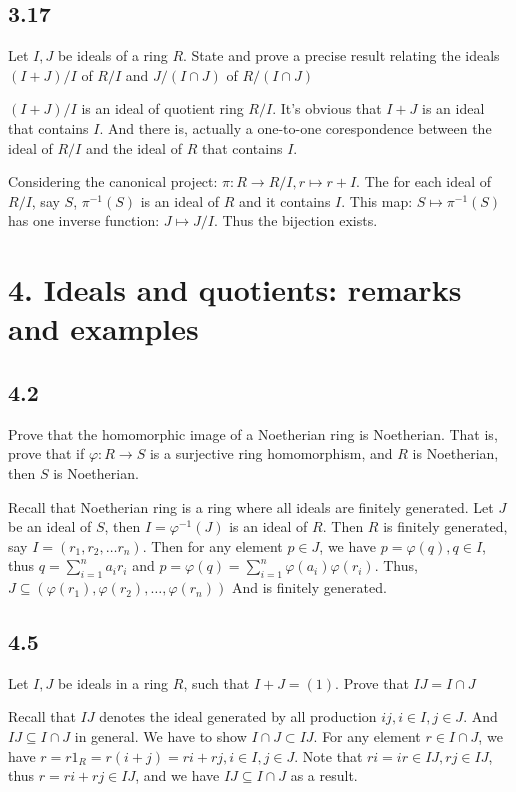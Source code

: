 \documentclass[a4paper, pdf, 12pt]{article}
\makeatletter
\renewenvironment{proof}[1][\proofname]{\par
  \pushQED{\qed}%
  \normalfont \topsep6\p@\@plus6\p@\relax
  \trivlist
  \item[%
    \hskip\labelsep
    \normalfont\bfseries %
    #1%
    \@addpunct{.}%
  ]\ignorespaces
}{%
  \popQED\endtrivlist\@endpefalse
}
\let\qed\relax %
\DeclareRobustCommand{\qed}{%
  \ifmmode \mathqed
  \else
    \leavevmode\unskip\penalty\@M\hbox{}\nobreak\hspace{.5em minus .1em}%
    \hbox{\qedsymbol}%
  \fi
}
\makeatother
\begin{document}
\subsection*{3.17}
Let $I, J$ be ideals of a ring $R$. State and prove a precise result relating the
ideals $(I + J)/I$ of $R/I$ and $J/(I \cap J)$ of $R/(I \cap J)$
\begin{proof}
  $(I + J)/I$ is an ideal of quotient ring $R/I$. It's obvious that $I+J$ is an
  ideal that contains $I$. And there is, actually a one-to-one corespondence between 
  the ideal of $R/I$ and the ideal of $R$ that contains $I$. 

  Considering the canonical project: $\pi: R\rightarrow R/I, r\mapsto r+I$. The for each 
  ideal of $R/I$, say $S$, $\pi^{-1}(S)$ is an ideal of $R$ and it contains $I$. This 
  map: $S\mapsto \pi^{-1}(S)$ has one inverse function: $J\mapsto J/I$. Thus the bijection 
  exists.
\end{proof}

\section*{4. Ideals and quotients: remarks and examples}
\subsection*{4.2}
Prove that the homomorphic image of a Noetherian ring is Noetherian. That is, 
prove that if $\varphi: R \rightarrow S$ is a surjective ring homomorphism, and 
$R$ is Noetherian, then $S$ is Noetherian.

\begin{proof}
  Recall that Noetherian ring is a ring where all ideals are finitely generated.
  Let $J$ be an ideal of $S$, then $I=\varphi^{-1}(J)$ is an ideal of $R$. Then $R$ is 
  finitely generated, say $I = (r_1, r_2,\ldots r_n)$. Then for any element $p\in J$, we 
  have $p = \varphi(q), q\in I$, thus $q=\sum_{i=1}^{n}a_ir_i$ and 
  $p = \varphi(q) = \sum_{i=1}^{n}\varphi(a_i)\varphi(r_i)$. Thus, $J\subseteq (\varphi(r_1), \varphi(r_2), \ldots, \varphi(r_n))$
  And is finitely generated.
\end{proof}

\subsection*{4.5}
Let $I, J$ be ideals in a ring $R$, such that $I + J = (1)$. Prove that $IJ = I \cap J$
\begin{proof}
  Recall that $IJ$ denotes the ideal generated by all production $ij, i\in I, j\in J$. And 
  $IJ\subseteq I\cap J$ in general. We have to show $I\cap J\subset IJ$. For any element $r\in I\cap J$, 
  we have $r = r1_{R} = r(i + j) = ri + rj, i\in I, j\in J$. Note that $ri = ir\in IJ, rj\in IJ$, thus 
  $r = ri+rj \in IJ$, and we have $IJ\subseteq I\cap J$ as a result.
\end{proof}
\end{document}
